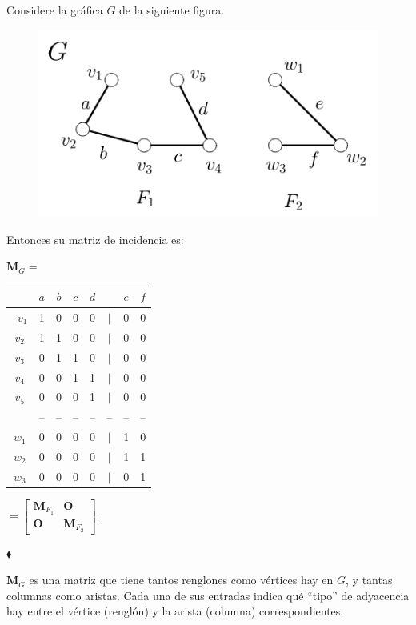 \begin{ejem}\label{ejem:matrizDeIncidenciaDeInconexa}
Considere la gráfica $G$ de la siguiente figura.

\begin{figure}[H]
    \centering
    \includegraphics[scale=0.75]{img/imgchapter1/matrizDeIncidenciaInconexa.png}
    \caption{}
    \label{fig:matrizdeincidenciaInconexa}
\end{figure}

Entonces su matriz de incidencia es:
\begin{center}


$\mathbf{M}_{G} =$ \begin{tabular}{c| c c c c c c c }
 & $a$ & $b$ & $c$ & $d$ &    & $e$ & $f$\\
\hline \
$v_{1}$ & 1 & 0 & 0 & 0 & $|$ & 0 & 0\\ 
$v_{2}$ & 1 & 1 & 0 & 0 & $|$ & 0 & 0\\ 
$v_{3}$ & 0 & 1 & 1 & 0 & $|$ & 0 & 0\\ 
$v_{4}$ & 0 & 0 & 1 & 1 & $|$ & 0 & 0\\ 
$v_{5}$ & 0 & 0 & 0 & 1 & $|$ & 0 & 0\\
        & --& --& --& --& --  & --& --\\
$w_{1}$ & 0 & 0 & 0 & 0 & $|$ & 1 & 0  \\ 
$w_{2}$ & 0 & 0 & 0 & 0 & $|$ & 1 & 1 \\ 
$w_{3}$ & 0 & 0 & 0 & 0 & $|$ & 0 & 1  
\end{tabular} $= \begin{bmatrix}
\mathbf{M}_{F_{1}} & \mathbf{O}\\ 
\mathbf{O} & \mathbf{M}_{F_{2}}
\end{bmatrix}. $
\end{center}
\hfill $\blacklozenge$
\end{ejem}

$\mathbf{M}_{G}$ es una matriz que tiene tantos renglones como vértices hay en $G$, y tantas columnas como aristas. Cada una de sus entradas indica qué ``tipo'' de adyacencia hay entre el vértice (renglón) y la arista (columna) correspondientes.  

